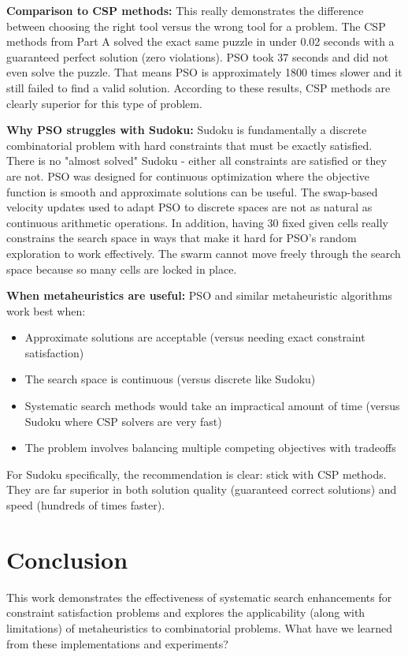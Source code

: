 \documentclass[letterpaper]{article}
\begin{document}
\textbf{Comparison to CSP methods:} This really demonstrates the difference between choosing the right tool versus the wrong tool for a problem. The CSP methods from Part A solved the exact same puzzle in under 0.02 seconds with a guaranteed perfect solution (zero violations). PSO took 37 seconds and did not even solve the puzzle. That means PSO is approximately 1800 times slower and it still failed to find a valid solution. According to these results, CSP methods are clearly superior for this type of problem.

\textbf{Why PSO struggles with Sudoku:} Sudoku is fundamentally a discrete combinatorial problem with hard constraints that must be exactly satisfied. There is no "almost solved" Sudoku - either all constraints are satisfied or they are not. PSO was designed for continuous optimization where the objective function is smooth and approximate solutions can be useful. The swap-based velocity updates used to adapt PSO to discrete spaces are not as natural as continuous arithmetic operations. In addition, having 30 fixed given cells really constrains the search space in ways that make it hard for PSO's random exploration to work effectively. The swarm cannot move freely through the search space because so many cells are locked in place.

\textbf{When metaheuristics are useful:} PSO and similar metaheuristic algorithms work best when:
\begin{itemize}
\item Approximate solutions are acceptable (versus needing exact constraint satisfaction)
\item The search space is continuous (versus discrete like Sudoku)
\item Systematic search methods would take an impractical amount of time (versus Sudoku where CSP solvers are very fast)
\item The problem involves balancing multiple competing objectives with tradeoffs
\end{itemize}

For Sudoku specifically, the recommendation is clear: stick with CSP methods. They are far superior in both solution quality (guaranteed correct solutions) and speed (hundreds of times faster).

\section{Conclusion}

This work demonstrates the effectiveness of systematic search enhancements for constraint satisfaction problems and explores the applicability (along with limitations) of metaheuristics to combinatorial problems. What have we learned from these implementations and experiments?
\end{document}
